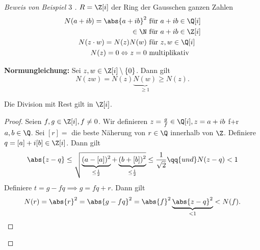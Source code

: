 \begin{proof}[Beweis von Beispiel $3$ ]
	$R = \Z[i]$ der Ring der Gausschen ganzen Zahlen
	\begin{align*}
		N(a+ib) = \abs{a+ib}^2 &\text{ für } a + ib \in \Q[i] \\
		\in \N &\text{ für } a+ib \in \Z[i]\\
		N(z\cdot w) = N(z) N(w) &\text{ für } z,w \in \Q[i]\\
		N(z) = 0  \Leftrightarrow z = 0 &\text{ multiplikativ} 
	\end{align*}

	\textbf{Normungleichung:} Sei $z,w \in \Z[i] \setminus \{0\}$. Dann gilt
	\[
		N(zw) = N(z) \underbrace{N(w)}_{\geq 1} \geq N(z)
	.\] 
	\begin{lemma}
		Die Division mit Rest gilt in $\Z[i]$.
	\end{lemma}
	\begin{proof}
		Seien $f,g \in \Z[i], f \neq 0$. Wir definieren $z = \frac{g}{f} \in \Q[i], z = a+ib$ f+r $a,b \in \Q$.
		Sei $[r] = $ die beste Näherung von $r \in \Q$ innerhalb von $\Z$.
		Definiere $q = [a] + i[b] \in \Z[i]$. Dann gilt 
		\begin{align*}
			\abs{z-q} \leq \sqrt{\underbrace{(a- [a])^2}_{\leq \frac{1}{2}} + \underbrace{(b+[b])^2}_{\leq \frac{1}{2}}} \leq \frac{1}{\sqrt{2}} \qq{ und }
			N(z-q) < 1
		\end{align*}
		Definiere $t = g - f q \implies g = fq + r$. Dann gilt
		\begin{align*}
			N(r) = \abs{r}^2 = \abs{g-fq}^2 = \abs{f}^2 \underbrace{\abs{z-q}^2}_{< 1} < N(f)
		.\end{align*}
	\end{proof}
\end{proof}

